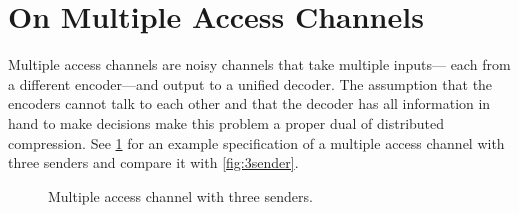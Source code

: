\documentclass[openany]{amsbook}
\numberwithin{equation}{chapter}
\numberwithin{figure}{chapter}
\numberwithin{table}{chapter}
\theoremstyle{definition}	理dfn:Definition~?s			理exa:Example~?s
\theoremstyle{remark}		理cla:Claim~?s				理rem:Remark~?s
\begin{document}
\section{On Multiple Access Channels}

	Multiple access channels are noisy channels that take multiple inputs---%
	each from a different encoder---and output to a unified decoder.
	The assumption that the encoders cannot talk to each other
	and that the decoder has all information in hand to make decisions
	make this problem a proper dual of distributed compression.
	See \cref{fig:mac} for an example specification of a multiple access channel
	with three senders and compare it with \cref{fig:3sender}.
	
	\begin{figure}
		\caption{
			Multiple access channel with three senders.
		}\label{fig:mac}
	\end{figure}
	
\end{document}
